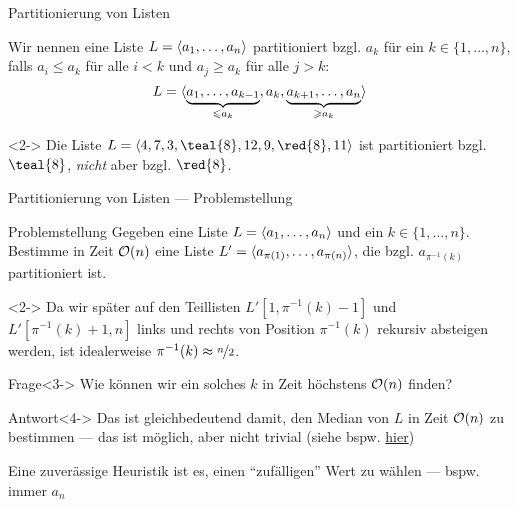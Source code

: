 \begin{frame}{Partitionierung von Listen}
\begin{definition}[Partitionierung]
Wir nennen eine Liste $L = \langle a_1, \dots, a_n\rangle$ \alert{partitioniert bzgl. $a_k$} f\"ur ein $k \in \{ 1, \dots, n \}$, falls $a_i \leq a_k$ f\"ur alle $i < k$ und $a_j \geq a_k$ f\"ur alle $j > k$:
$$L = \langle\underbrace{a_1, \dots, a_{k-1}}_{\leqslant a_k}, a_k, \underbrace{a_{k+1}, \dots, a_n}_{\geqslant a_k}\rangle$$
\end{definition}

\begin{example}<2->
Die Liste $L = \alglist{4, 7, 3, \teal{8}, 12, 9, \red{8}, 11}$ ist partitioniert bzgl. $\teal{8}$, \emph{nicht} aber bzgl. $\red{8}$.
\end{example}
\end{frame}

\begin{frame}{Partitionierung von Listen --- Problemstellung}
\begin{block}{Problemstellung}
Gegeben eine Liste $L = \langle a_1, \dots, a_n\rangle$ und ein $k \in \{ 1, \dots, n \}$.
Bestimme in Zeit $\mathcal{O}(n)$ eine Liste $L' = \langle a_{\pi(1)}, \dots, a_{\pi(n)}\rangle$, die bzgl. $a_{\pi^{-1}(k)}$ partitioniert ist.
\end{block}

\begin{remark}<2->
Da wir sp\"ater auf den Teillisten $L'[1, \pi^{-1}(k)-1]$ und $L'[\pi^{-1}(k)+1, n]$ links und rechts von Position $\pi^{-1}(k)$ rekursiv absteigen werden, ist idealerweise $\pi^{-1}(k) \approx \nicefrac{n}{2}$.
\end{remark}

\begin{block}{Frage}<3->
Wie k\"onnen wir ein solches $k$ in Zeit h\"ochstens $\mathcal{O}(n)$ finden?
\end{block}

\begin{block}{Antwort}<4->
Das ist gleichbedeutend damit, den \alert{Median} von $L$ in Zeit $\mathcal{O}(n)$ zu bestimmen --- das ist m\"oglich, aber nicht trivial (siehe bspw. \href{https://www.cs.hhu.de/fileadmin/redaktion/Fakultaeten/Mathematisch-Naturwissenschaftliche_Fakultaet/Informatik/Computational_Cell_Biology/AlDat/Alg2016_03.pdf}{\alert{hier}})

Eine zuver\"assige \alert{Heuristik} ist es, einen ``zuf\"alligen'' Wert zu w\"ahlen --- bspw. immer $a_n$
\end{block}
\end{frame}

